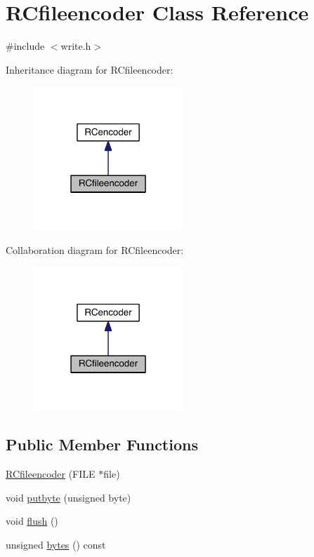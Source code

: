 \hypertarget{class_r_cfileencoder}{}\section{R\+Cfileencoder Class Reference}
\label{class_r_cfileencoder}


{\ttfamily \#include $<$write.\+h$>$}



Inheritance diagram for R\+Cfileencoder\+:\nopagebreak
\begin{figure}[H]
\begin{center}
\leavevmode
\includegraphics[width=159pt]{d4/d68/class_r_cfileencoder__inherit__graph}
\end{center}
\end{figure}


Collaboration diagram for R\+Cfileencoder\+:\nopagebreak
\begin{figure}[H]
\begin{center}
\leavevmode
\includegraphics[width=159pt]{da/dc8/class_r_cfileencoder__coll__graph}
\end{center}
\end{figure}
\subsection*{Public Member Functions}
\begin{DoxyCompactItemize}
\item 
\hyperlink{class_r_cfileencoder_a3f37d15b0560c21baea8694c23243d29}{R\+Cfileencoder} (F\+I\+L\+E $\ast$file)
\item 
void \hyperlink{class_r_cfileencoder_ad8fdff8700a365cde48a2ba8a14e0db1}{putbyte} (unsigned byte)
\item 
void \hyperlink{class_r_cfileencoder_a9982d3f78e72c5fc335b548d2be57fa6}{flush} ()
\item 
unsigned \hyperlink{class_r_cfileencoder_adf8be191c0963704648dd6327f609820}{bytes} () const 
\end{DoxyCompactItemize}
